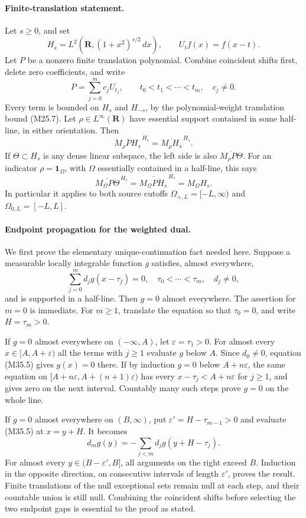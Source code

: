 \paragraph{Finite-translation statement.}
Let $s\ge0$, and set
\[
 H_s=L^2(\mathbf R,(1+x^2)^{s/2}\,dx),\qquad
 U_tf(x)=f(x-t).
 \tag{M35.1}
\]
Let $P$ be a nonzero finite translation polynomial.  Combine
coincident shifts first, delete zero coefficients, and write
\[
                P=\sum_{j=0}^{m}c_jU_{t_j},\qquad
          t_0<t_1<\cdots<t_m,\quad c_j\ne0.
 \tag{M35.2}
\]
Every term is bounded on $H_s$ and $H_{-s}$, by the
polynomial-weight translation bound (M25.7).
Let $\rho\in L^\infty(\mathbf R)$ have essential support
contained in some half-line, in either orientation.  Then
\[
 \overline{M_\rho P H_s}^{\,H_s}
                 =\overline{M_\rho H_s}^{\,H_s}.
 \tag{M35.3}
\]
If $\Theta\subset H_s$ is any dense linear subspace,
the left side is also $\overline{M_\rho P\Theta}$.
For an indicator $\rho=\mathbf1_\Omega$, with $\Omega$
essentially contained in a half-line, this says
\[
 \overline{M_\Omega P\Theta}^{\,H_s}
      =\overline{M_\Omega\overline{P H_s}}^{\,H_s}
      =M_\Omega H_s.
 \tag{M35.4}
\]
In particular it applies to both source cutoffs
$\Omega_{+,L}=[-L,\infty)$ and $\Omega_{0,L}=[-L,L]$.

\paragraph{Endpoint propagation for the weighted dual.}
We first prove the elementary unique-continuation fact
needed here.  Suppose a measurable locally integrable
function $g$ satisfies, almost everywhere,
\[
                 \sum_{j=0}^{m}d_jg(x-\tau_j)=0,
 \quad \tau_0<\cdots<\tau_m,\quad d_j\ne0,
 \tag{M35.5}
\]
and is supported in a half-line.  Then $g=0$ almost
everywhere.  The assertion for $m=0$ is immediate.
For $m\ge1$, translate the equation so that $\tau_0=0$,
and write $H=\tau_m>0$.

If $g=0$ almost everywhere on $(-\infty,A)$, let
$\varepsilon=\tau_1>0$.  For almost every
$x\in[A,A+\varepsilon)$ all the terms with $j\ge1$
evaluate $g$ below $A$.  Since $d_0\ne0$, equation
(M35.5) gives $g(x)=0$ there.  If by induction $g=0$
below $A+n\varepsilon$, the same equation on
$[A+n\varepsilon,A+(n+1)\varepsilon)$ has every
$x-\tau_j<A+n\varepsilon$ for $j\ge1$, and gives
zero on the next interval.  Countably many such steps
prove $g=0$ on the whole line.

If $g=0$ almost everywhere on $(B,\infty)$, put
$\varepsilon'=H-\tau_{m-1}>0$ and evaluate (M35.5)
at $x=y+H$.  It becomes
\[
 d_mg(y)=-\sum_{j<m}d_jg(y+H-\tau_j).
 \tag{M35.6}
\]
For almost every $y\in(B-\varepsilon',B]$, all
arguments on the right exceed $B$.  Induction in the
opposite direction, on consecutive intervals of length
$\varepsilon'$, proves the result.  Finite translations
of the null exceptional sets remain null at each step,
and their countable union is still null.  Combining the
coincident shifts before selecting the two endpoint gaps
is essential to the proof as stated.


